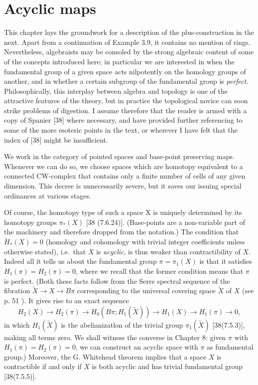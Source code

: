 \chapter{Acyclic maps} %
\label{cha:4acyclic_maps}
This chapter lays the groundwork for a description of the plus-construction in the next. Apart from a continuation of Example 3.9, it contains no mention of rings. Nevertheless, algebraists may be consoled by the strong algebraic content of some of the concepts introduced here; in particular we are interested in when the fundamental group of a given space acts nilpotently on the homology groups of another, and in whether a certain subgroup of the fundamental group is {\em perfect}. Philosophically, this interplay between algebra and topology is one of the attractive features of the theory, but in practice the topological novice can soon strike problems of digestion. I assume therefore that the reader is armed with a copy of Spanier [38] where necessary, and have provided further referencing to some of the more esoteric points in the text, or wherever I have felt that the index of [38] might be insufficient.

We work in the category of pointed spaces and base-point preserving maps. Whenever we can do so, we choose spaces which are homotopy equivalent to a connected CW-complex that contains only a finite number of cells of any given dimension. This decree is unnecessarily severe, but it saves our issuing special ordinances at various stages.

Of course, the homotopy type of such a space X is uniquely determined by its homotopy groups $\pi_*(X)$ [38 (7.6.24)]. (Base-points are a non-variable part of the machinery and therefore dropped from the notation.) The condition that $\widetilde{H}_*(X) = 0$ (homology and cohomology with trivial integer coefficients unless otherwise stated), i.e.\  that $X$ is {\em acyclic}, is thus weaker than contractibility of $X$. Indeed all it tells us about the fundamental group $\pi =\pi_1(X)$ is that it satisfies $H_1(\pi) = H_2(\pi) = 0$, where we recall that the former condition means that $\pi$ is perfect. (Both these facts follow from the Serre spectral sequence of the fibration $\widetilde{X} \longrightarrow X \longrightarrow B\pi$ corresponding to the universal covering space $\widetilde{X}$ of $X$ (see p. 51 ). It gives rise to an exact sequence
\[H_2(X)\longrightarrow H_2(\pi) \longrightarrow H_0(B\pi; H_1(\widetilde{X}))\longrightarrow H_1(X)\longrightarrow H_1(\pi) \longrightarrow 0,\]
in which $H_1(\widetilde{X})$ is the abelianizatlon of the trivial group $\pi_1(\widetilde{X})$ [38(7.5.3)], making all terms zero. We shall witness the converse in Chapter 8: given $\pi$ with $H_1(\pi) = H_2(\pi) = 0$, we can construct an acyclic space with $\pi$ as fundamental group.) Moreover, the G. Whitehead theorem implies that a space $X$ is contractible if and only if $X$ is both acyclic and has trivial fundamental group [38(7.5.5)].

